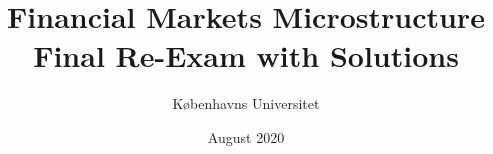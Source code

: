 \documentclass[11pt
, answers
]{exam}
\begin{document}
	
	\title{Financial Markets Microstructure\\
		Final Re-Exam with Solutions}
	\author{K{\o}benhavns Universitet}
	\date{August 2020}
	\maketitle
	
	
	
\end{document}
